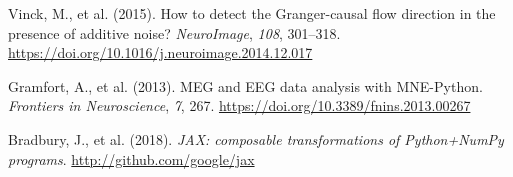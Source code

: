 \documentclass[10pt,a4paper,onecolumn]{article}
\newlength{\cslhangindent}
\newenvironment{CSLReferences}[2]
 {\begin{list}{}{%
  \setlength{\itemindent}{0pt}
  \setlength{\leftmargin}{0pt}
  \setlength{\parsep}{0pt}
  \ifodd #1
   \setlength{\leftmargin}{\cslhangindent}
   \setlength{\itemindent}{-1\cslhangindent}
  \fi
  \setlength{\itemsep}{#2\baselineskip}}}
 {\end{list}}
\begin{document}
\begin{CSLReferences}{1}{0.5}
Vinck, M., et al. (2015). How to detect the Granger-causal flow
direction in the presence of additive noise? \emph{NeuroImage},
\emph{108}, 301--318.
\url{https://doi.org/10.1016/j.neuroimage.2014.12.017}

Gramfort, A., et al. (2013). MEG and EEG data analysis with MNE-Python.
\emph{Frontiers in Neuroscience}, \emph{7}, 267.
\url{https://doi.org/10.3389/fnins.2013.00267}

Bradbury, J., et al. (2018). \emph{JAX: composable transformations of
Python+NumPy programs}. \url{http://github.com/google/jax}

\end{CSLReferences}
\end{document}
